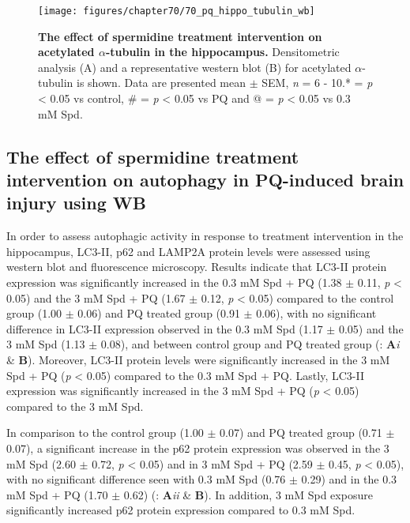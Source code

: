 \begin{figure}[!htbp]
\center
  \texttt{[image: figures/chapter70/70\_pq\_hippo\_tubulin\_wb]}
  \caption[The effect of spermidine treatment intervention on acetylated $\alpha$-tubulin expression in the hippocampus]{\textbf{The effect of spermidine treatment intervention on acetylated $\alpha$-tubulin in the hippocampus.} Densitometric analysis (A) and a representative western blot (B) for acetylated $\alpha$-tubulin is shown. Data are presented  mean $\pm$ SEM, \textit{n} = 6 - 10.* = \textit{p} < 0.05 vs control, \# = \textit{p} < 0.05 vs PQ and @ = \textit{p} < 0.05 vs 0.3 mM Spd.}
  \label{fig:70_pq_hippo_tubulin_wb}
\end{figure} 

\subsection{The effect of spermidine treatment intervention on autophagy in PQ-induced brain injury using WB}
In order to assess autophagic activity in response to treatment intervention in the hippocampus, LC3-II, p62 and LAMP2A protein levels were assessed using western blot and fluorescence microscopy. Results indicate that LC3-II protein expression was significantly increased in the 0.3 mM Spd + PQ (1.38 $\pm$ 0.11, \textit{p} < 0.05) and the 3 mM Spd + PQ (1.67 $\pm$ 0.12, \textit{p} < 0.05) compared to the control group (1.00 $\pm$ 0.06) and PQ treated group (0.91 $\pm$ 0.06), with no significant difference in LC3-II expression observed in the 0.3 mM Spd (1.17 $\pm$ 0.05) and the 3 mM Spd (1.13 $\pm$ 0.08), and between control group and PQ treated group (: \textbf{A}\textit{i} \& \textbf{B}). Moreover, LC3-II protein levels were significantly increased in the 3 mM Spd + PQ (\textit{p} < 0.05) compared to the 0.3 mM Spd + PQ. Lastly, LC3-II expression was significantly increased in the 3 mM Spd + PQ (\textit{p} < 0.05) compared to the 3 mM Spd.

In comparison to the control group (1.00 $\pm$ 0.07) and PQ treated group (0.71 $\pm$ 0.07), a significant increase in the p62 protein expression was observed in the 3 mM Spd (2.60 $\pm$ 0.72, \textit{p} < 0.05) and in 3 mM Spd + PQ (2.59 $\pm$ 0.45, \textit{p} < 0.05), with no significant difference seen with 0.3 mM Spd (0.76 $\pm$ 0.29) and in the 0.3 mM Spd + PQ (1.70 $\pm$ 0.62) (: \textbf{A}\textit{ii} \& \textbf{B}). In addition, 3 mM Spd exposure significantly increased p62 protein expression compared to 0.3 mM Spd.


